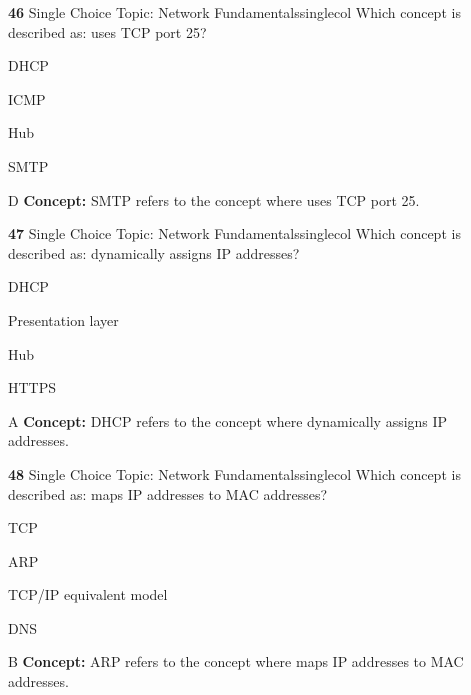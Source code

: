 \documentclass[10pt,a4paper]{article}
\begin{document}
\begin{qcard}{\color{white}\textbf{46} \hfill \small Single Choice \textbar{} Topic: Network Fundamentals}{singlecol}
Which concept is described as: uses TCP port 25?

\begin{qoptions}
\item DHCP
\item ICMP
\item Hub
\item SMTP
\end{qoptions}
\begin{explainbox}{D}
\textbf{Concept:} SMTP refers to the concept where uses TCP port 25.
\end{explainbox}
\end{qcard}

\begin{qcard}{\color{white}\textbf{47} \hfill \small Single Choice \textbar{} Topic: Network Fundamentals}{singlecol}
Which concept is described as: dynamically assigns IP addresses?

\begin{qoptions}
\item DHCP
\item Presentation layer
\item Hub
\item HTTPS
\end{qoptions}
\begin{explainbox}{A}
\textbf{Concept:} DHCP refers to the concept where dynamically assigns IP addresses.
\end{explainbox}
\end{qcard}

\begin{qcard}{\color{white}\textbf{48} \hfill \small Single Choice \textbar{} Topic: Network Fundamentals}{singlecol}
Which concept is described as: maps IP addresses to MAC addresses?

\begin{qoptions}
\item TCP
\item ARP
\item TCP/IP equivalent model
\item DNS
\end{qoptions}
\begin{explainbox}{B}
\textbf{Concept:} ARP refers to the concept where maps IP addresses to MAC addresses.
\end{explainbox}
\end{qcard}
\end{document}
